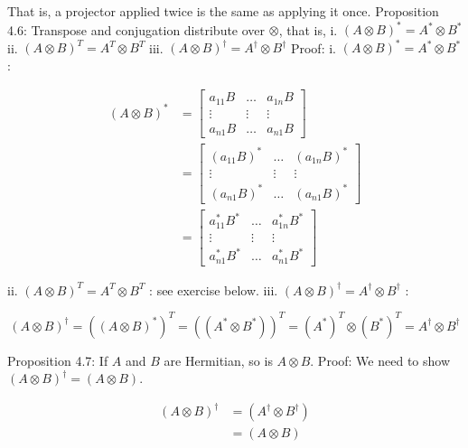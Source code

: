 \documentclass[main.tex]{subfiles}
\begin{document}
    That is, a projector applied twice is the same as applying it once. Proposition 4.6: Transpose and conjugation distribute over $\otimes$, that is, i. $(A \otimes B)^{*}=A^{*} \otimes B^{*}$ ii. $(A \otimes B)^{T}=A^{T} \otimes B^{T}$ iii. $(A \otimes B)^{\dagger}=A^{\dagger} \otimes B^{\dagger}$ Proof: i. $(A \otimes B)^{*}=A^{*} \otimes B^{*}$ :
    
    $$
    \begin{aligned}
    (A \otimes B)^{*} &=\left[\begin{array}{ccc}
    a_{11} B & \ldots & a_{1 n} B \\
    \vdots & \vdots & \vdots \\
    a_{n 1} B & \ldots & a_{n 1} B
    \end{array}\right] \\
    &=\left[\begin{array}{ccc}
    \left(a_{11} B\right)^{*} & \ldots & \left(a_{1 n} B\right)^{*} \\
    \vdots & \vdots & \vdots \\
    \left(a_{n 1} B\right)^{*} & \ldots & \left(a_{n 1} B\right)^{*}
    \end{array}\right] \\
    &=\left[\begin{array}{ccc}
    a_{11}^{*} B^{*} & \ldots & a_{1 n}^{*} B^{*} \\
    \vdots & \vdots & \vdots \\
    a_{n 1}^{*} B^{*} & \ldots & a_{n 1}^{*} B^{*}
    \end{array}\right]
    \end{aligned}
    $$
    
    ii. $(A \otimes B)^{T}=A^{T} \otimes B^{T}$ : see exercise below. iii. $(A \otimes B)^{\dagger}=A^{\dagger} \otimes B^{\dagger}$ :
    
    $$
    (A \otimes B)^{\dagger}=\left((A \otimes B)^{*}\right)^{T}=\left(\left(A^{*} \otimes B^{*}\right)\right)^{T}=\left(A^{*}\right)^{T} \otimes\left(B^{*}\right)^{T}=A^{\dagger} \otimes B^{\dagger}
    $$
    
    Proposition 4.7: If $A$ and $B$ are Hermitian, so is $A \otimes B$. Proof: We need to show $(A \otimes B)^{\dagger}=(A \otimes B)$.
    
    $$
    \begin{aligned}
    (A \otimes B)^{\dagger} &=\left(A^{\dagger} \otimes B^{\dagger}\right) \\
    &=(A \otimes B)
    \end{aligned}
    $$
    
\end{document}
